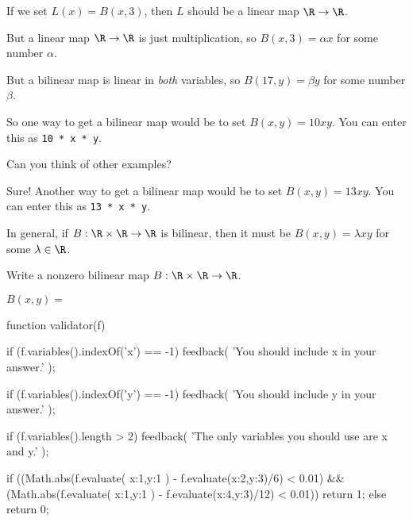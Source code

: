 \documentclass{ximera}
\begin{document}
\begin{question}
  \begin{hint}
    If we set $L(x) = B(x,3)$, then $L$ should be a linear map $\R \to \R$.
  \end{hint}

  \begin{hint}
    But a linear map $\R \to \R$ is just multiplication, so $B(x,3) = \alpha x$ for some number $\alpha$.
  \end{hint}

  \begin{hint}
    But a bilinear map is linear in \textit{both} variables, so $B(17,y) = \beta y$ for some number $\beta$.
  \end{hint}

  \begin{hint}
    So one way to get a bilinear map would be to set $B(x,y) = 10 x y$.  You can enter this as \texttt{10 * x * y}.
  \end{hint}

  \begin{hint}
    Can you think of other examples?
  \end{hint}

  \begin{hint}
    Sure!  Another way to get a bilinear map would be to set $B(x,y) = 13 x y$.  You can enter this as \texttt{13 * x * y}.
  \end{hint}

  \begin{hint}
    In general, if $B : \R \times \R \to \R$ is bilinear, then it must
    be $B(x,y) = \lambda x y$ for some $\lambda \in \R$.
  \end{hint}

  Write a nonzero bilinear map  $B: \R \times \R \to \R$.  
  \begin{solution}
    $B(x,y) = $ \begin{expression-answer}
  	function validator(f) {
    if (f.variables().indexOf('x') == -1) {
      feedback( 'You should include x in your answer.' );
    }
    
     if (f.variables().indexOf('y') == -1) {
      feedback( 'You should include y in your answer.' );
    }

    if (f.variables().length > 2) {
      feedback( 'The only variables you should use are x and y.' );
    }

    if ((Math.abs(f.evaluate( {x:1,y:1} ) - f.evaluate({x:2,y:3})/6) < 0.01) &&
        (Math.abs(f.evaluate( {x:1,y:1} ) - f.evaluate({x:4,y:3})/12) < 0.01)) {
          return 1;
    } else {
      return 0;
    }
  }
    \end{expression-answer}
  \end{solution}
\end{question}
	
\end{document}
